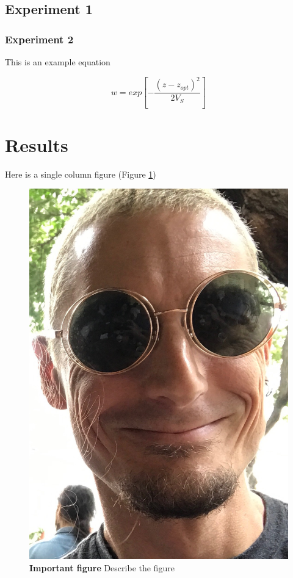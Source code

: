 \documentclass[9pt,twocolumn,twoside]{rilabRxiv}
\begin{document}
\subsection{Experiment 1}
\blindtext

\subsubsection{Experiment 2}
This is an example equation

\begin{equation}
\label{eqn:fitness}
w =exp [-\frac{(z-z_{opt})^2}{2V_S}]
\end{equation}

\blindtext
\section{Results}

Here is a single column figure (Figure \ref{fig:figure1})

\begin{figure}[ht]
\includegraphics[width=0.6\linewidth]{figures/jri_bee.jpg}
\caption{\textbf{Important figure} Describe the figure }
\label{fig:figure1}
\end{figure}

\blindtext

\blindtext
\blindtext
\blindtext
\blindtext
\end{document}

